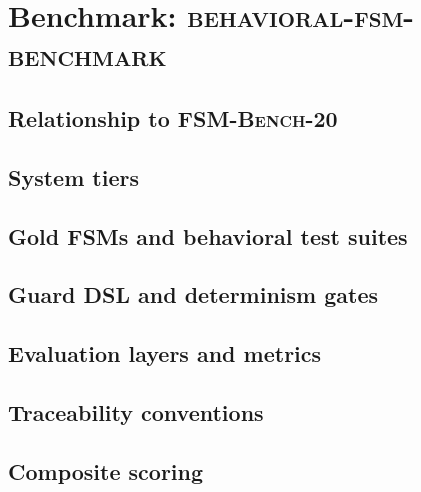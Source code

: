 \section{Benchmark: \texorpdfstring{\textsc{behavioral-fsm-benchmark}}{behavioral-fsm-benchmark}}
\label{sec:benchmark}


\subsection{Relationship to \texorpdfstring{\textsc{FSM-Bench-20}}{FSM-Bench-20}}
\label{sec:benchmark:upstream}

\subsection{System tiers}
\label{sec:benchmark:tiers}

\subsection{Gold FSMs and behavioral test suites}
\label{sec:benchmark:artifacts}

\subsection{Guard DSL and determinism gates}
\label{sec:benchmark:guards}

\subsection{Evaluation layers and metrics}
\label{sec:benchmark:metrics}

\subsection{Traceability conventions}
\label{sec:benchmark:traceability}

\subsection{Composite scoring}
\label{sec:benchmark:scoring}

